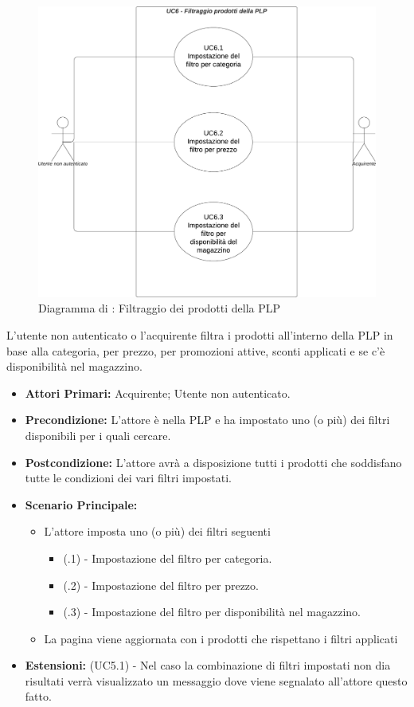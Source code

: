 \begin{figure}[H]
    \centering
    \includegraphics[scale=0.5]{Immagini/DiagrammiUC/UC6FiltraggioProdottiDellaPLP.png}
    \caption{Diagramma di \actualUC: Filtraggio dei prodotti della PLP} 
\end{figure}

L'utente non autenticato o l'acquirente filtra i prodotti all'interno della PLP in base alla categoria, per prezzo, per promozioni attive, sconti applicati e se c'è disponibilità nel magazzino.
\begin{itemize}
    \item \textbf{Attori Primari:} Acquirente; Utente non autenticato.
    \item \textbf{Precondizione:} L'attore è nella PLP e ha impostato uno (o più) dei filtri disponibili per i quali cercare.
    \item \textbf{Postcondizione:} L'attore avrà a disposizione tutti i prodotti che soddisfano tutte le condizioni dei vari filtri impostati.
    \item \textbf{Scenario Principale:}
    \begin{itemize}
        \item L'attore imposta uno (o più) dei filtri seguenti 
        \begin{itemize}
            \item (\actualUC.1) - Impostazione del filtro per categoria.
            \item (\actualUC.2) - Impostazione del filtro per prezzo.
            \item (\actualUC.3) - Impostazione del filtro per disponibilità nel magazzino.
        \end{itemize}
        \item La pagina viene aggiornata con i prodotti che rispettano i filtri applicati
    \end{itemize}
    \item \textbf{Estensioni:} (UC5.1) - Nel caso la combinazione di filtri impostati non dia risultati verrà visualizzato un messaggio dove viene segnalato all'attore questo fatto.
\end{itemize}

